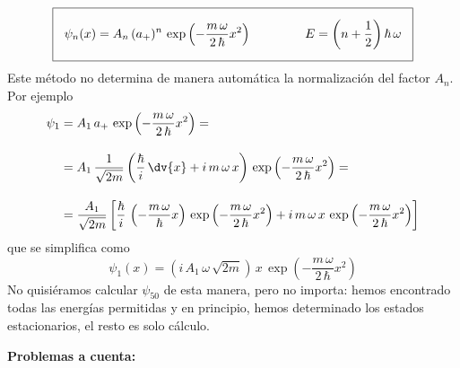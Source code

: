  \begin{equation}
\setlength{\fboxsep}{3\fboxsep}\boxed{ \psi_{n} (x) = A_{n} \, (a_{+})^{n} \, \exp \left( - \dfrac{m \, \omega}{2 \, \hbar} x^{2} \right) \hspace{1.5cm} E = \left( n + \dfrac{1}{2} \right) \hbar \, \omega}
\label{eq:ecuacion_02_050}
 \end{equation}
Este método no determina de manera automática la normalización del factor $A_{n}$. Por ejemplo
\begin{align*}
\psi_{1} &= A_{1} \, a_{+} \, \exp \left( - \dfrac{m \, \omega}{2 \, \hbar} x^{2} \right) = \\[1em]
&= A_{1} \, \dfrac{1}{\sqrt{2 m}} \left( \dfrac{\hbar}{i} \, \dv{x} + i \, m \, \omega \, x \right) \, \exp \left( - \dfrac{m \, \omega}{2 \, \hbar} x^{2} \right) = \\[1em]
&= \dfrac{A_{1}}{\sqrt{2 m}} \left[ \dfrac{\hbar}{i} \, \left( - \dfrac{m \, \omega}{\hbar} x \right)  \, \exp \left( - \dfrac{m \, \omega}{2 \, \hbar} x^{2} \right) + i \, m \, \omega \, x \, \exp \left( - \dfrac{m \, \omega}{2 \, \hbar} x^{2} \right) \right] 
\end{align*}
que se simplifica como
\begin{equation}
\psi_{1} (x) = \left( i \, A_{1} \, \omega \, \sqrt{2 m }  \right) \, x \, \exp \left( - \dfrac{m \, \omega}{2 \, \hbar} x^{2} \right)
\label{eq:ecuacion_02_051}
\end{equation}
No quisiéramos calcular $\psi_{50}$ de esta manera, pero no importa: hemos encontrado todas las energías permitidas y en principio, hemos determinado los estados estacionarios, el resto es solo cálculo.
\par
\textbf{Problemas a cuenta:}
